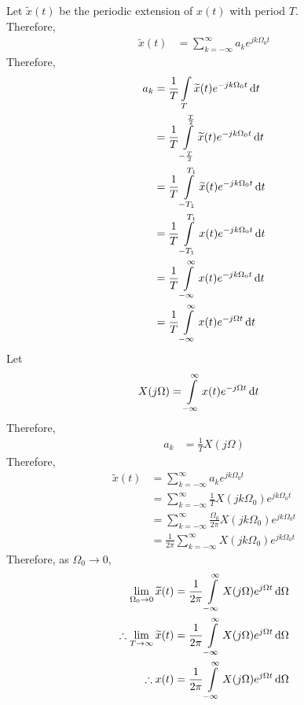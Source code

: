 \documentclass[titlepage, fleqn, a4paper, 12pt, twoside]{article}
\theoremstyle{definition}
\theoremstyle{theorem}
\renewcommand{\tilde}{\widetilde}
\begin{document}
Let $\tilde{x}(t)$ be the periodic extension of $x(t)$ with period $T$.\\
Therefore,
\begin{align*}
	\tilde{x}(t) &= \sum\limits_{k = -\infty}^{\infty} a_k e^{j k \Omega_0 t}
\end{align*}
Therefore,
\begin{align*}
	a_k &= \frac{1}{T} \int\limits_{T} \tilde{x}(t) e^{-j k \Omega_0 t} \dif t\\
	&= \frac{1}{T} \int\limits_{-\frac{T}{2}}^{\frac{T}{2}} \tilde{x}(t) e^{-j k \Omega_0 t} \dif t\\
	&= \frac{1}{T} \int\limits_{-T_1}^{T_1} \tilde{x}(t) e^{-j k \Omega_0 t} \dif t\\
	&= \frac{1}{T} \int\limits_{-T_1}^{T_1} x(t) e^{-j k \Omega_0 t} \dif t\\
	&= \frac{1}{T} \int\limits_{-\infty}^{\infty} x(t) e^{-j k \Omega_0 t} \dif t\\
	&= \frac{1}{T} \int\limits_{-\infty}^{\infty} x(t) e^{-j \Omega t} \dif t
\end{align*}
Let
\begin{align*}
	X(j \Omega) &= \int\limits_{-\infty}^{\infty} x(t) e^{-j \Omega t} \dif t
\end{align*}
Therefore,
\begin{align*}
	a_k &= \frac{1}{T} X(j \Omega)
\end{align*}
Therefore,
\begin{align*}
	\tilde{x}(t) &= \sum\limits_{k = -\infty}^{\infty} a_k e^{j k \Omega_0 t}\\
	&= \sum\limits_{k = -\infty}^{\infty} \frac{1}{T} X(j k \Omega_0) e^{j k \Omega_0 t}\\
	&= \sum\limits_{k = -\infty}^{\infty} \frac{\Omega_0}{2 \pi} X(j k \Omega_0) e^{j k \Omega_0 t}\\
	&= \frac{1}{2 \pi} \sum\limits_{k = -\infty}^{\infty} X(j k \Omega_0) e^{j k \Omega_0 t}
\end{align*}
Therefore, as $\Omega_0 \to 0$,
\begin{align*}
	\lim\limits_{\Omega_0 \to 0} \tilde{x}(t) &= \frac{1}{2 \pi} \int\limits_{-\infty}^{\infty} X(j \Omega) e^{j \Omega t} \dif \Omega\\
	\therefore \lim\limits_{T \to \infty} \tilde{x}(t) &= \frac{1}{2 \pi} \int\limits_{-\infty}^{\infty} X(j \Omega) e^{j \Omega t} \dif \Omega\\
	\therefore x(t) &= \frac{1}{2 \pi} \int\limits_{-\infty}^{\infty} X(j \Omega) e^{j \Omega t} \dif \Omega
\end{align*}
\end{document}
